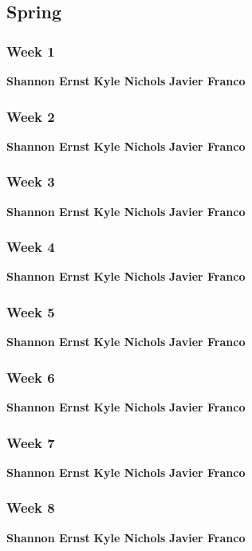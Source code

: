 \documentclass[../final.tex]{subfiles}
\begin{document}
\subsection{Spring}
\subsubsection{Week 1}
\textbf{Shannon Ernst}
\textbf{Kyle Nichols}
\textbf{Javier Franco}
\subsubsection{Week 2}
\textbf{Shannon Ernst}
\textbf{Kyle Nichols}
\textbf{Javier Franco}
\subsubsection{Week 3}
\textbf{Shannon Ernst}
\textbf{Kyle Nichols}
\textbf{Javier Franco}
\subsubsection{Week 4}
\textbf{Shannon Ernst}
\textbf{Kyle Nichols}
\textbf{Javier Franco}
\subsubsection{Week 5}
\textbf{Shannon Ernst}
\textbf{Kyle Nichols}
\textbf{Javier Franco}
\subsubsection{Week 6}
\textbf{Shannon Ernst}
\textbf{Kyle Nichols}
\textbf{Javier Franco}
\subsubsection{Week 7}
\textbf{Shannon Ernst}
\textbf{Kyle Nichols}
\textbf{Javier Franco}
\subsubsection{Week 8}
\textbf{Shannon Ernst}
\textbf{Kyle Nichols}
\textbf{Javier Franco}
\end{document}
